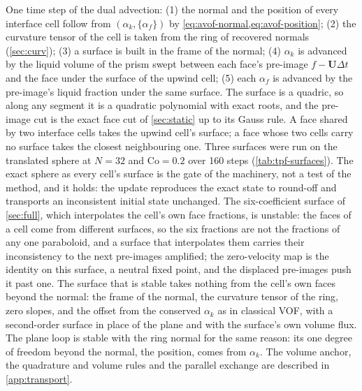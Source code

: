 One time step of the dual advection: (1) the normal and the position of every interface cell follow from $(\alpha_k, \{\alpha_f\})$ by \cref{eq:avof-normal,eq:avof-position}; (2) the curvature tensor of the cell is taken from the ring of recovered normals (\cref{sec:curv}); (3) a surface is built in the frame of the normal; (4) $\alpha_k$ is advanced by the liquid volume of the prism swept between each face's pre-image $f - \mathbf{U}\Delta t$ and the face under the surface of the upwind cell; (5) each $\alpha_f$ is advanced by the pre-image's liquid fraction under the same surface. The surface is a quadric, so along any segment it is a quadratic polynomial with exact roots, and the pre-image cut is the exact face cut of \cref{sec:static} up to its Gauss rule. A face shared by two interface cells takes the upwind cell's surface; a face whose two cells carry no surface takes the closest neighbouring one. Three surfaces were run on the translated sphere at $N = 32$ and $\mathrm{Co} = 0.2$ over 160 steps (\cref{tab:tpf-surfaces}). The exact sphere as every cell's surface is the gate of the machinery, not a test of the method, and it holds: the update reproduces the exact state to round-off and transports an inconsistent initial state unchanged. The six-coefficient surface of \cref{sec:full}, which interpolates the cell's own face fractions, is unstable: the faces of a cell come from different surfaces, so the six fractions are not the fractions of any one paraboloid, and a surface that interpolates them carries their inconsistency to the next pre-images amplified; the zero-velocity map is the identity on this surface, a neutral fixed point, and the displaced pre-images push it past one. The surface that is stable takes nothing from the cell's own faces beyond the normal: the frame of the normal, the curvature tensor of the ring, zero slopes, and the offset from the conserved $\alpha_k$ as in classical VOF, with a second-order surface in place of the plane and with the surface's own volume flux. The plane loop is stable with the ring normal for the same reason: its one degree of freedom beyond the normal, the position, comes from $\alpha_k$. The volume anchor, the quadrature and volume rules and the parallel exchange are described in \ref{app:transport}.

